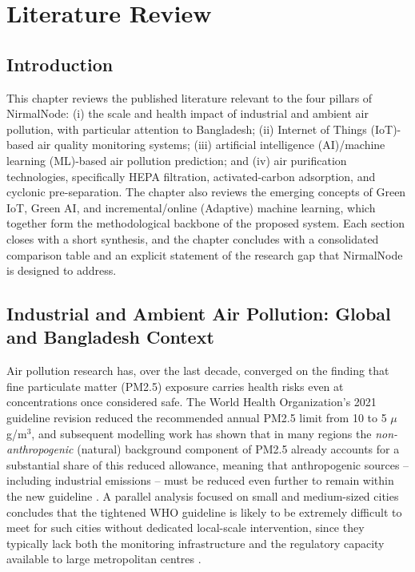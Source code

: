 \chapter{Literature Review}
\label{ch:literature-review}

\section{Introduction}
\label{sec:lr-intro}

This chapter reviews the published literature relevant to the four pillars of NirmalNode: (i) the scale and health impact of industrial and ambient air pollution, with particular attention to Bangladesh; (ii) Internet of Things (IoT)-based air quality monitoring systems; (iii) artificial intelligence (AI)/machine learning (ML)-based air pollution prediction; and (iv) air purification technologies, specifically HEPA filtration, activated-carbon adsorption, and cyclonic pre-separation. The chapter also reviews the emerging concepts of Green IoT, Green AI, and incremental/online (Adaptive) machine learning, which together form the methodological backbone of the proposed system. Each section closes with a short synthesis, and the chapter concludes with a consolidated comparison table and an explicit statement of the research gap that NirmalNode is designed to address.

\section{Industrial and Ambient Air Pollution: Global and Bangladesh Context}
\label{sec:lr-pollution-context}

Air pollution research has, over the last decade, converged on the finding that fine particulate matter (PM2.5) exposure carries health risks even at concentrations once considered safe. The World Health Organization's 2021 guideline revision reduced the recommended annual PM2.5 limit from 10 to 5 $\mu$g/m$^3$, and subsequent modelling work has shown that in many regions the \emph{non-anthropogenic} (natural) background component of PM2.5 already accounts for a substantial share of this reduced allowance, meaning that anthropogenic sources -- including industrial emissions -- must be reduced even further to remain within the new guideline \citep{pai2022who}. A parallel analysis focused on small and medium-sized cities concludes that the tightened WHO guideline is likely to be extremely difficult to meet for such cities without dedicated local-scale intervention, since they typically lack both the monitoring infrastructure and the regulatory capacity available to large metropolitan centres \citep{polezer2023new}.

